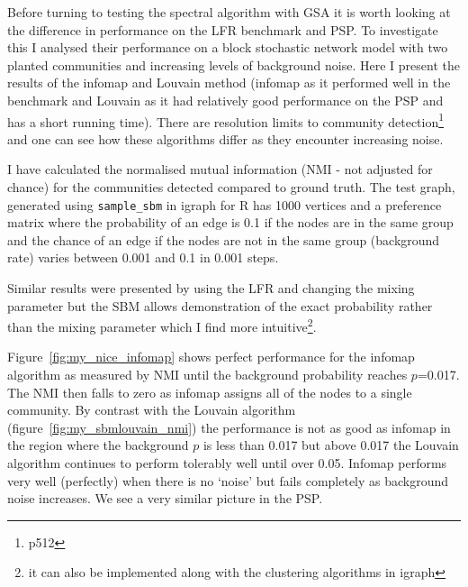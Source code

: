 Before turning to testing the spectral algorithm with GSA it is worth looking at the difference in performance on the LFR benchmark and PSP. To investigate this I analysed their performance on a block stochastic network model with two planted communities and increasing levels of background noise. Here I present the results of the infomap and Louvain method (infomap as it performed well in the benchmark and Louvain as it had relatively good performance on the PSP and has a short running time). There are resolution limits to community detection\cite{newman2018networks}\footnote{p512} and one can see how these algorithms differ as they encounter increasing noise. 


I have calculated the normalised mutual information (NMI - not adjusted for chance) for the communities detected compared to ground truth. The test graph, generated using \texttt{sample\_sbm} in igraph for R has 1000 vertices and a preference matrix where the probability of an edge is 0.1 if the nodes are in the same group and the chance of an edge if the nodes are not in the same group (background rate) varies between 0.001 and 0.1 in 0.001 steps.

Similar results were presented by \cite{yang2016comparative} using the LFR and changing the mixing parameter but the SBM allows demonstration of the exact probability rather than the mixing parameter which I find more intuitive\footnote{it can also be implemented along with the clustering algorithms in igraph}. 



Figure~\ref{fig:my_nice_infomap} shows perfect performance for the infomap algorithm as measured by NMI until the background probability reaches $p$=0.017. The NMI then falls to zero as infomap assigns all of the nodes to a single community. By contrast with the Louvain algorithm (figure~\ref{fig:my_sbmlouvain_nmi}) the performance is not as good as infomap in the region where the background $p$ is less than 0.017 but above 0.017 the Louvain algorithm continues to perform tolerably well until over 0.05. Infomap performs very well (perfectly) when there is no `noise' but fails completely as background noise increases. We see a very similar picture in the PSP. 



